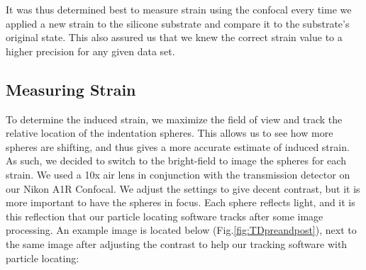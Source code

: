 It was thus determined best to measure strain using the confocal every time we applied a new strain to the silicone substrate and compare it to the substrate's original state. This also assured us that we knew the correct strain value to a higher precision for any given data set.


\subsection{Measuring Strain}
To determine the induced strain, we maximize the field of view and track the relative location of the indentation spheres. This allows us to see how more spheres are shifting, and thus gives a more accurate estimate of induced strain. As such, we decided to switch to the bright-field to image the spheres for each strain. We used a 10x air lens in conjunction with the transmission detector on our Nikon A1R Confocal. We adjust the settings to give decent contrast, but it is more important to have the spheres in focus. Each sphere reflects light, and it is this reflection that our particle locating software tracks after some image processing. An example image is located below (Fig.\ref{fig:TDpreandpost}), next to the same image after adjusting the contrast to help our tracking software with particle locating: 
